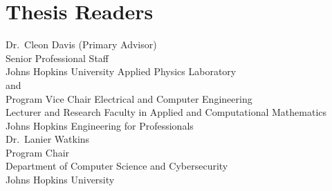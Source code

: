 \section*{Thesis Readers}
\begin{singlespace}
%
\noindent Dr.~Cleon Davis (Primary Advisor)\\
\indent \indent Senior Professional Staff\\
\indent \indent Johns Hopkins University Applied Physics Laboratory\\

\indent \indent and\\

\indent \indent Program Vice Chair Electrical and Computer Engineering\\
\indent \indent Lecturer and Research Faculty in Applied and Computational Mathematics\\
\indent \indent Johns Hopkins Engineering for Professionals\\


\noindent Dr.~Lanier Watkins\\
\indent \indent Program Chair\\
\indent \indent Department of Computer Science and Cybersecurity\\
\indent \indent Johns Hopkins University\\
\end{singlespace}